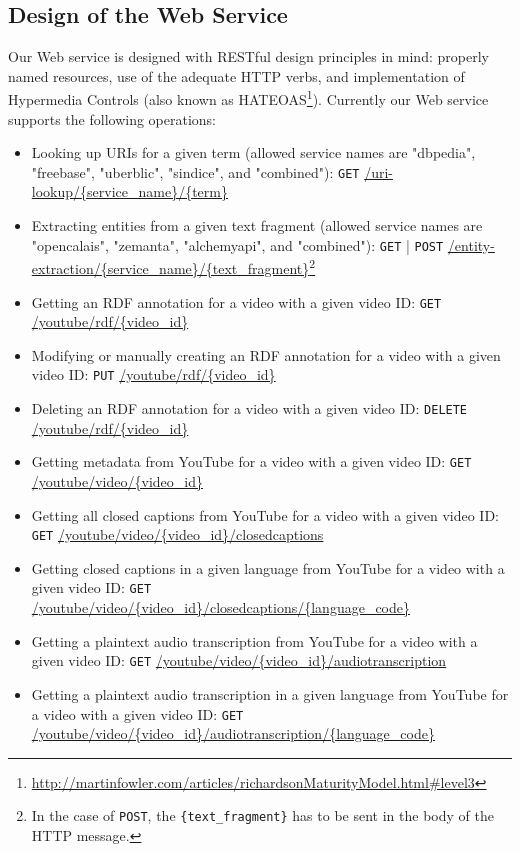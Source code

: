 \documentclass{acm_proc_article-sp}
\begin{document}
\subsection{Design of the Web Service}\label{sec:design}
Our Web service is designed with RESTful design principles in mind: properly named resources, use of the adequate HTTP verbs, and implementation of Hypermedia Controls (also known as HATEOAS\footnote{\url{http://martinfowler.com/articles/richardsonMaturityModel.html#level3}}). Currently our Web service supports the following operations:
\begin{itemize}
\item Looking up URIs for a given term (allowed service names are "dbpedia", "freebase", "uberblic", "sindice", and "combined"): \texttt{GET} \url{/uri-lookup/{service_name}/{term}} 
\item Extracting entities from a given text fragment (allowed service names are "opencalais", "zemanta", "alchemyapi", and "combined"): \texttt{GET} | \texttt{POST} \url{/entity-extraction/{service_name}/{text_fragment}}\footnote{In the case of \texttt{POST}, the \texttt{\{text\_fragment\}} has to be sent in the body of the HTTP message.}
\item Getting an RDF annotation for a video with a given video ID: \texttt{GET} \url{/youtube/rdf/{video_id}}
\item Modifying or manually creating an RDF annotation for a video with a given video ID: \texttt{PUT} \url{/youtube/rdf/{video_id}}
\item Deleting an RDF annotation for a video with a given video ID: \texttt{DELETE} \url{/youtube/rdf/{video_id}}
\item Getting metadata from YouTube for a video with a given video ID: \texttt{GET} \url{/youtube/video/{video_id}}
\item Getting all closed captions from YouTube for a video with a given video ID: \texttt{GET} \url{/youtube/video/{video_id}/closedcaptions}
\item Getting closed captions in a given language from YouTube for a video with a given video ID: \texttt{GET} \url{/youtube/video/{video_id}/closedcaptions/{language_code}}
\item Getting a plaintext audio transcription from YouTube for a video with a given video ID: \texttt{GET} \url{/youtube/video/{video_id}/audiotranscription}
\item Getting a plaintext audio transcription in a given language from YouTube for a video with a given video ID: \texttt{GET} \url{/youtube/video/{video_id}/audiotranscription/{language_code}}
\end{itemize}
\end{document}
